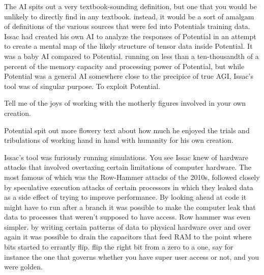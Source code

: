 The AI spits out a very textbook\hyp{}sounding definition, but one that you would be unlikely to directly find in any textbook. instead, it would be a sort of amalgam of definitions of the various sources that were fed into Potentials training data. Issac had created his own AI to analyze the responses of Potential in an attempt to create a mental map of the likely structure of tensor data inside Potential. It was a baby AI compared to Potential. running on less than a ten\hyp{}thousandth of a percent of the memory capacity and processing power of Potential, but while Potential was a general AI somewhere close to the precipice of true AGI, Issac's tool was of singular purpose. To exploit Potential.
\newline
\begin{receiver}
Tell me of the joys of working with the motherly figures involved in your own creation.
\end{receiver}
\begin{sender}
Potential spit out more flowery text about how much he enjoyed the trials and tribulations of working hand in hand with humanity for his own creation.
\end{sender}
Issac's tool was furiously running simulations. You see Issac knew of hardware attacks that involved overtaxing certain limitations of computer hardware. The most famous of which was the Row\hyp{}Hammer attacks of the 2010s, followed closely by speculative execution attacks of certain processors in which they leaked data as a side effect of trying to improve performance. By looking ahead at code it might have to run after a branch it was possible to make the computer leak that data to processes that weren't supposed to have access. Row hammer was even simpler. by writing certain patterns of data to physical hardware over and over again it was possible to drain the capacitors that feed RAM to the point where bits started to errantly flip. flip the right bit from a zero to a one, say for instance the one that governs whether you have super user access or not, and you were golden.

